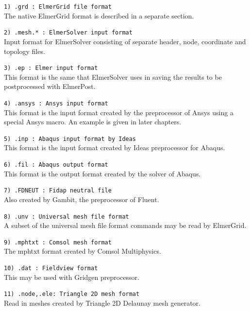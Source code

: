 \begin{description}
\item \texttt{1)  .grd      : ElmerGrid file format} \\
The native ElmerGrid format is  described in a separate section.

\item \texttt{2)  .mesh.*  : ElmerSolver input format} \\
Input format for ElmerSolver consisting of separate header,
node, coordinate and topology files.

\item \texttt{3)  .ep      : Elmer input format} \\
This format is the same that
ElmerSolver uses in saving the results to be 
postprocessed with ElmerPost. 

\item \texttt{4)  .ansys    : Ansys input format} \\
This format is the input format 
created by the preprocessor of Ansys using a special
Ansys macro.
An example is given in later chapters.

\item \texttt{5)  .inp    : Abaqus input format by Ideas} \\
This format is the input format 
created by Ideas preprocessor for Abaqus.

\item \texttt{6)  .fil    : Abaqus output format} \\
This format is the output format 
created by the solver of Abaqus.

\item \texttt{7)  .FDNEUT  : Fidap neutral file} \\
Also created by Gambit, the preprocessor of Fluent.

\item \texttt{8) .unv : Universal mesh file format} \\
A subset of the universal mesh file format commands may be read by ElmerGrid.

\item \texttt{9)  .mphtxt   : Comsol mesh format} \\
The mphtxt format created by Comsol Multiphysics. 

\item \texttt{10)  .dat      : Fieldview format} \\
This may be used with Gridgen preprocessor.

\item \texttt{11) .node,.ele: Triangle 2D mesh format} \\
Read in meshes created by Triangle 2D Delaunay mesh generator.


\end{description}
